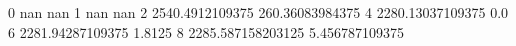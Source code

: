 0 nan nan
1 nan nan
2 2540.4912109375 260.36083984375
4 2280.13037109375 0.0
6 2281.94287109375 1.8125
8 2285.587158203125 5.456787109375
